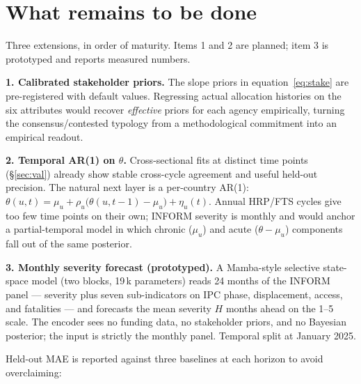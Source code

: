 \documentclass[11pt,a4paper]{article}
\begin{document}
\section{What remains to be done}\label{sec:next}

Three extensions, in order of maturity. Items 1 and 2 are planned;
item 3 is prototyped and reports measured numbers.

\textbf{1. Calibrated stakeholder priors.} The slope priors in
equation~\ref{eq:stake} are pre-registered with default values. Regressing
actual allocation histories on the six attributes would recover \emph{effective}
priors for each agency empirically, turning the consensus/contested typology
from a methodological commitment into an empirical readout.

\textbf{2. Temporal AR(1) on $\theta$.} Cross-sectional fits at distinct
time points (\S\ref{sec:val}) already show stable cross-cycle agreement and
useful held-out precision. The natural next layer is a per-country AR(1):
$\theta(u, t) = \mu_u + \rho_u\bigl(\theta(u, t-1) - \mu_u\bigr) + \eta_u(t)$.
Annual HRP/FTS cycles give too few time points on their own; INFORM severity
is monthly and would anchor a partial-temporal model in which chronic ($\mu_u$)
and acute ($\theta - \mu_u$) components fall out of the same posterior.

\textbf{3. Monthly severity forecast (prototyped).} A Mamba-style selective
state-space model (two blocks, 19\,k parameters) reads 24 months of the
INFORM panel --- severity plus seven sub-indicators on IPC phase, displacement,
access, and fatalities --- and forecasts the mean severity $H$ months ahead
on the 1--5 scale. The encoder sees no funding data, no stakeholder priors,
and no Bayesian posterior; the input is strictly the monthly panel. Temporal
split at January 2025.

Held-out MAE is reported against three baselines at each horizon to avoid
overclaiming:
\end{document}
